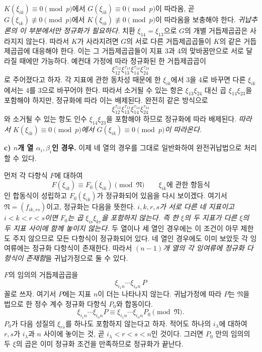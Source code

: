 \(K(\xi_{ik})\equiv0\pmod p\)에서 \(G(\xi_{ik})\equiv0\pmod p\)이 따라옴, 곧 \(G(\xi_{ik})\not\equiv0\pmod p\)에서 \(K(\xi_{ik})\not\equiv0\pmod p\)이 따라옴을 보충해야 한다. \emph{귀납추론의 이 부분에서만 정규화가 필요하다.} 치환 \(\xi_{14}=\xi_{13}\)으로 \(G\)의 개별 거듭제곱곱은 사라지지 않는다. 따라서 \(K\)가 사라지려면 \(G\)의 서로 다른 거듭제곱곱들이 \(K\)의 같은 거듭제곱곱에 대응해야 한다. 이는 그 거듭제곱곱들이 지표 3과 4의 맞바꿈만으로 서로 달라질 때에만 가능하다. 예컨대 가정에 따라 정규화된 한 거듭제곱곱이
\[
\xi_{12}^{\tau_{12}}\xi_{13}^{\tau_{13}}
\xi_{14}^{\tau_{14}}\xi_{24}^{\tau_{24}}
\]
로 주어졌다고 하자. 각 지표에 관한 동차성 때문에 한 \(\xi_{ik}\)에서 3을 4로 바꾸면 다른 \(\xi_{ik}\)에서는 4를 3으로 바꾸어야 한다. 따라서 소거될 수 있는 항은 \(\xi_{13}\xi_{24}\) 대신 곱 \(\xi_{14}\xi_{23}\)을 포함해야 하지만, 정규화에 따라 이는 배제된다. 완전히 같은 방식으로
\[
\xi_{12}^{\tau_{12}}\xi_{13}^{\tau_{13}}
\xi_{14}^{\tau_{14}}\xi_{24}^{\tau_{24}}
\]
와 소거될 수 있는 항도 인수 \(\xi_{14}\xi_{23}\)을 포함해야 하므로 정규화에 따라 배제된다. \emph{따라서 \(K(\xi_{ik})\equiv0\pmod p\)에서 \(G(\xi_{ik})\equiv0\pmod p\)이 따라온다.}

\textbf{c) \(n\)개 열 \(\alpha_i,\beta_i\)인 경우.}
이제 네 열의 경우를 그대로 일반화하여 완전귀납법으로 처리할 수 있다.

먼저 각 다항식 \(F\)에 대하여
\begin{equation}
\tag{10}
F(\xi_{ik})\equiv F_0(\xi_{ik})\pmod{\mathfrak N}
\qquad\text{\(\xi_{ik}\)에 관한 항등식}
\end{equation}
인 합동식이 성립하고 \(F_0(\xi_{ik})\)가 정규화되어 있음을 다시 보이겠다. 여기서 \(\mathfrak N=(f_{ik,rs})\)이고, 정규화는 다음을 뜻한다. \emph{\(i,k,r,s\)가 서로 다른 네 지표이고 \(i<k<r<s\)이면 \(F_0\)는 곱 \(\xi_{is}\xi_{kr}\)을 포함하지 않는다. 즉 한 \(\xi\)의 두 지표가 다른 \(\xi\)의 두 지표 사이에 함께 놓이지 않는다.} 두 열이나 세 열인 경우에는 이 조건이 아무 제한도 주지 않으므로 모든 다항식이 정규화되어 있다. 네 열인 경우에도 이미 보았듯 각 잉여류에는 정규화 다항식이 존재한다. 따라서 \emph{\((n-1)\)개 열의 각 잉여류에 정규화 다항식이 존재함}을 귀납가정으로 둘 수 있다.

\(F\)의 임의의 거듭제곱곱을
\[
\xi_{i_1n}\cdots\xi_{i_\sigma n}\,P
\]
꼴로 쓰자. 여기서 \(P\)에는 지표 \(n\)이 더는 나타나지 않는다. 귀납가정에 따라 \(P\)는 \(\mathfrak N\)을 법으로 한 정수 계수 정규화 다항식 \(P_0\)와 합동이다.
\[
\xi_{i_1n}\cdots\xi_{i_\sigma n}P
\equiv
\xi_{i_1n}\cdots\xi_{i_\sigma n}P_0
\pmod{\mathfrak N}.
\]
\(P_0\)가 다음 성질의 \(\xi_{rs}\)를 하나도 포함하지 않는다고 하자. 적어도 하나의 \(i_\lambda\)에 대하여 \(r,s\)가 \(i_\lambda\)과 \(n\) 사이에 놓이는 것, 곧 \(i_\lambda<r<s<n\)인 것이다. 그러면 \(P_0\) 안의 임의의 두 \(\xi\)의 곱은 이미 정규화 조건을 만족하므로 정규화가 끝난다.

